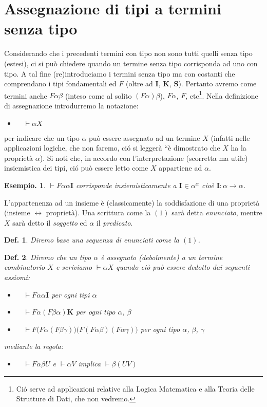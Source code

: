 \documentclass{book}
\newtheorem{definizione}{Def.}[chapter]
\newtheorem{esempio}{Esempio.}
\newcommand*{\II}{$\mathbf{I}$}    %
\newcommand*{\KK}{$\mathbf{K}$}    %
\newcommand*{\SSS}{$\mathbf{S}$}   %
\newcommand*{\ii}{\mathbf{I}}    %
\newcommand*{\kk}{\mathbf{K}}    %
\newcommand*{\asse}{\vdash\!\!           }
\begin{document}
\section{Assegnazione di tipi a termini senza tipo}
Considerando che i precedenti termini con tipo non sono tutti quelli senza tipo
(estesi), ci si pu\`o chiedere quando un termine senza tipo corrisponda ad uno
con tipo.
A tal fine (re)introduciamo i termini senza tipo ma con costanti che 
comprendano i tipi fondamentali ed $F$ (oltre ad \II, \KK, \SSS). Pertanto
avremo come termini anche $F\alpha\beta$ (inteso come al solito 
$(F\alpha)\beta$), $F\alpha$, $F$, etc\footnote{Ci\'o serve ad applicazioni
relative alla Logica Matematica e alla Teoria delle Strutture di Dati, che
non vedremo.}. 
Nella definizione di assegnazione introdurremo la notazione:
\begin{itemize}
\item[$(1)$] $\quad\asse \alpha X$
\end{itemize}
per indicare che un tipo $\alpha$ pu\`o essere assegnato ad un termine $X$ 
(infatti nelle applicazioni logiche, che non faremo, ci\'o si legger\`a ``\`e 
dimostrato che $X$ ha la propriet\`a $\alpha$). Si noti che, in accordo con 
l'interpretazione (scorretta ma utile) insiemistica dei tipi, ci\'o pu\`o 
essere letto come $X$ appartiene ad $\alpha$.
\begin{esempio}
 $\asse F\alpha\alpha\ii$ corrisponde insiemisticamente
a $\ii \in \alpha^\alpha$ cio\`e $\ii \colon \alpha \to \alpha$.
\end{esempio}

L'appartenenza ad un insieme \`e (classicamente) la soddisfazione di una 
propriet\`a (insieme $\leftrightarrow$ propriet\`a). Una scrittura come la 
$(1)$ sar\`a detta \emph{enunciato}, mentre $X$ sar\`a detto il \emph{soggetto}
ed $\alpha$ il \emph{predicato}.

\begin{definizione}
Diremo \emph{base} una sequenza di enunciati come la $(1)$.
\end{definizione}

\begin{definizione}
Diremo che un tipo $\alpha$ \`e \emph{assegnato (debolmente)} a un termine 
combinatorio $X$ e scriviamo $\asse \alpha X$ quando ci\`o pu\`o essere dedotto
dai seguenti assiomi:
\begin{itemize}
\item[$(FI)$]$\quad \asse F\alpha\alpha\ii$ per ogni tipi $\alpha$
\item[$(FK)$]$\quad \asse F\alpha(F\beta\alpha)\kk$ per ogni tipo $\alpha$,
  $\beta$
\item[$(FS)$]$\quad \asse F\bigl(F\alpha(F\beta\gamma)\bigr)
  \bigl(F(F\alpha\beta)(F\alpha\gamma)\bigr)$ per ogni tipo $\alpha$, $\beta$, 
  $\gamma$
\end{itemize}
mediante la regola:
\begin{itemize}
\item[$(F)$]$\quad \asse F\alpha\beta U$ e $\asse\alpha V$ implica $\asse 
\beta(UV)$
\end{itemize}

\end{definizione}
\end{document}

